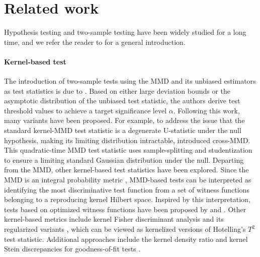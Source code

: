 \section{Related work}
Hypothesis testing and two-sample testing have been widely studied for a long time, and we refer the reader to  for a general introduction. 

\paragraph{Kernel-based test} 
The introduction of two-sample tests using the MMD and its unbiased estimators as test statistics is due to .
Based on either large deviation bounds or the asymptotic distribution of the unbiased test statistic, the authors derive test threshold values to achieve a target significance level $α$. Following this work, many variants have been proposed. For example, to address the issue that the standard kernel-MMD test statistic is a degenerate U-statistic under the null hypothesis, making its limiting distribution intractable,  introduced cross-MMD. This quadratic-time MMD test statistic uses sample-splitting and studentization to ensure a limiting standard Gaussian distribution under the null.
Departing from the MMD, other kernel-based test statistics have been explored. 
Since the MMD is an integral probability metric , MMD-based tests can be interpreted as identifying the most discriminative test function from a set of witness functions belonging to a reproducing kernel Hilbert space. Inspired by this interpretation, tests based on optimized witness functions have been proposed by  and .
Other kernel-based metrics include kernel Fisher discriminant analysis  and its regularized variants , which can be viewed as kernelized versions of Hotelling’s $T^2$ test statistic. Additional approaches include the kernel density ratio  and kernel Stein discrepancies for goodness-of-fit tests .


